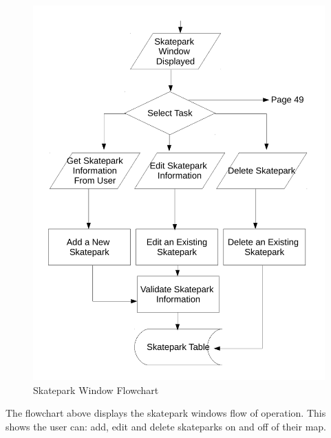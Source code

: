 \begin{figure}[H]
    \includegraphics[width=\textwidth]{./Design/SkateparkFlowchart.pdf}
    \caption{Skatepark Window Flowchart} \label{fig:Skatepark Flowchart}
\end{figure}

The flowchart above displays the skatepark windows flow of operation. This shows the user can: add, edit and delete skateparks on and off of their map.


